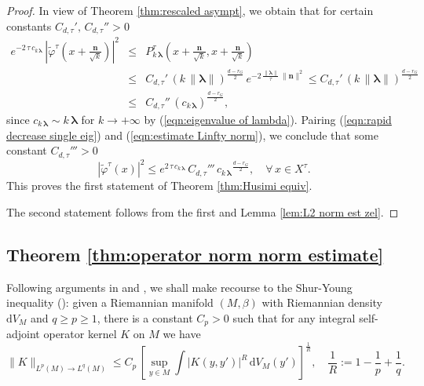 \documentclass[12pt,a4paper]{article}
\theoremstyle{plain}
\theoremstyle{definition}
\begin{document}
\begin{proof}
In view of Theorem \ref{thm:rescaled asympt},
we obtain that for certain constants 
$C_{d,\tau}',\,C_{d,\tau}''>0$
\begin{eqnarray}
\label{eqn:estimate Linfty norm}
e^{-2\,\tau\,c_{k\,\boldsymbol{\lambda}}}\,\left|
\tilde{\varphi}^\tau\left( x+\frac{\mathbf{n} }{\sqrt{k}}\right)\right|^2
&\le&P^\tau_{k\,\boldsymbol{\lambda}} 
\left( x+\frac{\mathbf{n} }{\sqrt{k}},
x+\frac{\mathbf{n} }{\sqrt{k}}
\right)\nonumber\\
&\le& C_{d,\tau}'\,\left( k\,\| \boldsymbol{\lambda} \| \right)
^{\frac{d-r_G}{2}}\,e^{-2\,\frac{\|\boldsymbol{\lambda}\|}{\tau}\,
\|\mathbf{n}  \|^2}\le 
C_{d,\tau}'\,\left( k\,\| \boldsymbol{\lambda} \| \right)
^{\frac{d-r_G}{2}}\nonumber\\
&\le&
C_{d,\tau}''\,
(c_{k\,\boldsymbol{\lambda}})
^{\frac{d-r_G}{2}},
\end{eqnarray}
since 
$c_{k\,\boldsymbol{\lambda}}\sim k\,\boldsymbol{\lambda}$
for $k\rightarrow +\infty$
by (\ref{eqn:eigenvalue of lambda}).
Pairing (\ref{eqn:rapid decrease single eig}) and
(\ref{eqn:estimate Linfty norm}), we conclude
that some constant $C_{d,\tau}'''>0$
$$
\left|
\tilde{\varphi}^\tau\left( x\right)\right|^2\le 
e^{2\,\tau\,c_{k\,\boldsymbol{\lambda}}}\,
C_{d,\tau}'''\,
{c_{k\,\boldsymbol{\lambda}}}
^{\frac{d-r_G}{2}},\quad \forall\,x\in X^\tau.
$$
This proves the first statement of Theorem \ref{thm:Husimi equiv}.

The second statement follows from the first and 
Lemma \ref{lem:L2 norm est zel}.

\end{proof}



\subsection{Theorem \ref{thm:operator norm norm estimate}}

Following arguments in \cite{sz03} and \cite{cr2},
we shall make recourse to the Shur-Young inequality (\cite{so}): 
%
given a Riemannian manifold
$(M,\beta)$ with Riemannian density $\mathrm{d}V_M$ and $q\ge p\ge 1$,
there is a constant $C_p>0$ such that
for any integral self-adjoint operator kernel $K$ on $M$ we have
$$
\|K\|_{L^p(M)\rightarrow L^q(M)}\le 
C_p\,\left[
\sup_{y\in M} 
\int\big|K(y,y')\big|^R\,
\mathrm{d}V_M(y')  \right ]^{\frac{1}{R}},\quad 
\frac{1}{R}:=1-\frac{1}{p}+\frac{1}{q}.
$$
\end{document}
